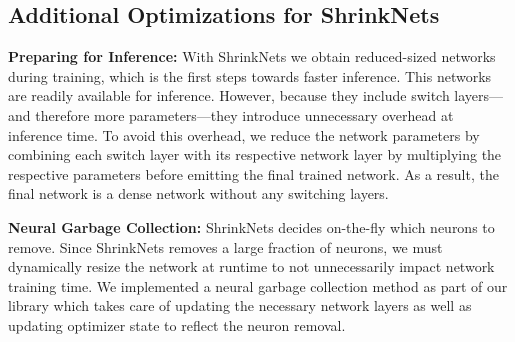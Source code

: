 
\subsection{Additional Optimizations for ShrinkNets}

\noindent\textbf{Preparing for Inference: } With ShrinkNets we obtain
reduced-sized networks during training, which is the first steps towards faster
inference. This networks are readily available for inference. However, because
they include switch layers---and therefore more parameters---they introduce
unnecessary overhead at inference time. To avoid this overhead, we reduce the
network parameters by combining each switch layer with its respective network
layer by multiplying the respective parameters before emitting the final trained
network. As a result, the final network is a dense network without any switching layers. 

\noindent\textbf{Neural Garbage Collection: }ShrinkNets decides on-the-fly which
neurons to remove. Since ShrinkNets removes a large fraction of neurons, we must
dynamically resize the network at runtime to not unnecessarily impact network
training time. We implemented a neural garbage collection method as part of our
library which takes care of updating the necessary network layers as well as
updating optimizer state to reflect the neuron removal.


